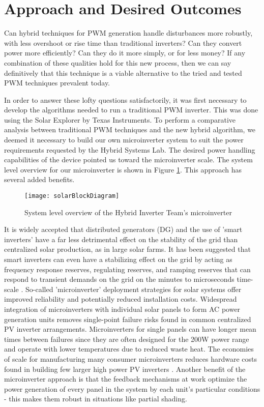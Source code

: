 \section{Approach and Desired Outcomes}
Can hybrid techniques for PWM generation handle disturbances more robustly, with less overshoot or rise time than traditional inverters? Can they convert power more efficiently? Can they do it more simply, or for less money? If any combination of these qualities hold for this new process, then we can say definitively that this technique is a viable alternative to the tried and tested PWM techniques prevalent today.

In order to answer these lofty questions satisfactorily, it was first necessary to develop the algorithms needed to run a traditional PWM inverter. This was done using the Solar Explorer by Texas Instruments. To perform a comparative analysis between traditional PWM techniques and the new hybrid algorithm, we deemed it necessary to build our own microinverter system to suit the power requirements requested by the Hybrid Systems Lab. The desired power handling capabilities of the device pointed us toward the microinverter scale. The system level overview for our microinverter is shown in Figure \ref{solarBlock}. This approach has several added benefits.

\begin{figure}[h]
\centering
\texttt{[image: solarBlockDiagram]}
\caption{System level overview of the Hybrid Inverter Team's microinverter}
\label{solarBlock}
\end{figure}

It is widely accepted that distributed generators (DG) and the use of 'smart inverters' have a far less detrimental effect on the stability of the grid than centralized solar production, as in large solar farms. It has been suggested that smart inverters can even have a stabilizing effect on the grid by acting as frequency response reserves, regulating reserves, and ramping reserves that can respond to transient demands on the grid on the minutes to microseconds time-scale \cite{futureGrid}. So-called 'microinverter' deployment strategies for solar systems offer improved reliability and potentially reduced installation costs. Widespread integration of microinverters with individual solar panels to form AC power generation units removes single-point failure risks found in common centralized PV inverter arrangements. Microinverters for single panels can have longer mean times between failures since they are often designed for the 200W power range and operate with lower temperatures due to reduced waste heat. The economies of scale for manufacturing many consumer microinverters reduces hardware costs found in building few larger high power PV inverters \cite{microchip}. Another benefit of the microinverter approach is that the feedback mechanisms at work optimize the power generation of every panel in the system by each unit's particular conditions - this makes them robust in situations like partial shading.

